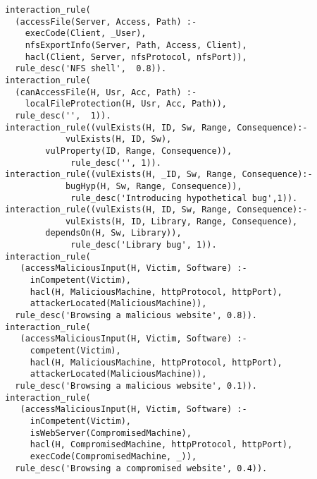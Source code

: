 \begin{lstlisting}[style=datalog, label={lst:mulval_primitives}, caption={Mulval Primitive and Derived Facts}]
interaction_rule(
  (accessFile(Server, Access, Path) :-
	execCode(Client, _User),
    nfsExportInfo(Server, Path, Access, Client),
    hacl(Client, Server, nfsProtocol, nfsPort)),
  rule_desc('NFS shell',  0.8)).
interaction_rule(
  (canAccessFile(H, Usr, Acc, Path) :-
	localFileProtection(H, Usr, Acc, Path)),
  rule_desc('',  1)).
interaction_rule((vulExists(H, ID, Sw, Range, Consequence):-
	        vulExists(H, ID, Sw),
		vulProperty(ID, Range, Consequence)),
             rule_desc('', 1)).
interaction_rule((vulExists(H, _ID, Sw, Range, Consequence):-
	        bugHyp(H, Sw, Range, Consequence)),
             rule_desc('Introducing hypothetical bug',1)).
interaction_rule((vulExists(H, ID, Sw, Range, Consequence):-
	        vulExists(H, ID, Library, Range, Consequence),
		dependsOn(H, Sw, Library)),
             rule_desc('Library bug', 1)).
interaction_rule(
   (accessMaliciousInput(H, Victim, Software) :-
     inCompetent(Victim),
     hacl(H, MaliciousMachine, httpProtocol, httpPort),
     attackerLocated(MaliciousMachine)),
  rule_desc('Browsing a malicious website', 0.8)).
interaction_rule(
   (accessMaliciousInput(H, Victim, Software) :-
     competent(Victim),
     hacl(H, MaliciousMachine, httpProtocol, httpPort),
     attackerLocated(MaliciousMachine)),
  rule_desc('Browsing a malicious website', 0.1)).
interaction_rule(
   (accessMaliciousInput(H, Victim, Software) :-
     inCompetent(Victim),
     isWebServer(CompromisedMachine),
     hacl(H, CompromisedMachine, httpProtocol, httpPort),
     execCode(CompromisedMachine, _)),
  rule_desc('Browsing a compromised website', 0.4)).
\end{lstlisting}